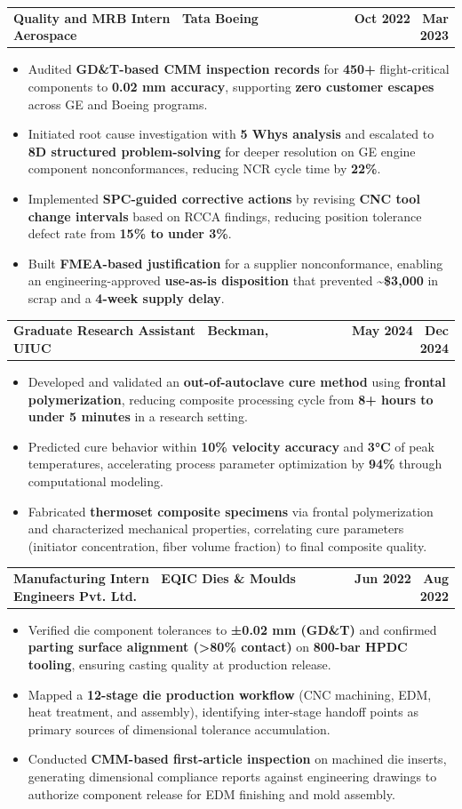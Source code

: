 \documentclass[letterpaper,10pt]{extarticle}
\makeatletter
\newcommand{\expentry}[2]{%
  \vspace{4pt}%
  \noindent\begin{tabularx}{\textwidth}{@{}X r@{}}
    {\fontsize{11pt}{13pt}\selectfont\textbf{#1}} & {\fontsize{11pt}{13pt}\selectfont\textbf{#2}}
  \end{tabularx}%
  \vspace{4pt}%
}
\makeatother
\begin{document}
\expentry{Quality and MRB Intern \textbar\ Tata Boeing Aerospace}{Oct 2022 \textbar\ Mar 2023}
\begin{itemize}
  \item Audited \textbf{GD\&T-based CMM inspection records} for \textbf{450+} flight-critical components to \textbf{0.02 mm accuracy}, supporting \textbf{zero customer escapes} across GE and Boeing programs.
  \item Initiated root cause investigation with \textbf{5 Whys analysis} and escalated to \textbf{8D structured problem-solving} for deeper resolution on GE engine component nonconformances, reducing NCR cycle time by \textbf{22\%}.
  \item Implemented \textbf{SPC-guided corrective actions} by revising \textbf{CNC tool change intervals} based on RCCA findings, reducing position tolerance defect rate from \textbf{15\% to under 3\%}.
  \item Built \textbf{FMEA-based justification} for a supplier nonconformance, enabling an engineering-approved \textbf{use-as-is disposition} that prevented \textbf{\textasciitilde\$3,000} in scrap and a \textbf{4-week supply delay}.
\end{itemize}

\expentry{Graduate Research Assistant \textbar\ Beckman, UIUC}{May 2024 \textbar\ Dec 2024}
\begin{itemize}
  \item Developed and validated an \textbf{out-of-autoclave cure method} using \textbf{frontal polymerization}, reducing composite processing cycle from \textbf{8+ hours to under 5 minutes} in a research setting.
  \item Predicted cure behavior within \textbf{10\% velocity accuracy} and \textbf{3°C} of peak temperatures, accelerating process parameter optimization by \textbf{94\%} through computational modeling.
  \item Fabricated \textbf{thermoset composite specimens} via frontal polymerization and characterized mechanical properties, correlating cure parameters (initiator concentration, fiber volume fraction) to final composite quality.
\end{itemize}

\expentry{Manufacturing Intern \textbar\ EQIC Dies \& Moulds Engineers Pvt. Ltd.}{Jun 2022 \textbar\ Aug 2022}
\begin{itemize}
  \item Verified die component tolerances to \textbf{±0.02 mm (GD\&T)} and confirmed \textbf{parting surface alignment ({>}80\% contact)} on \textbf{800-bar HPDC tooling}, ensuring casting quality at production release.
  \item Mapped a \textbf{12-stage die production workflow} (CNC machining, EDM, heat treatment, and assembly), identifying inter-stage handoff points as primary sources of dimensional tolerance accumulation.
  \item Conducted \textbf{CMM-based first-article inspection} on machined die inserts, generating dimensional compliance reports against engineering drawings to authorize component release for EDM finishing and mold assembly.
\end{itemize}
\end{document}
